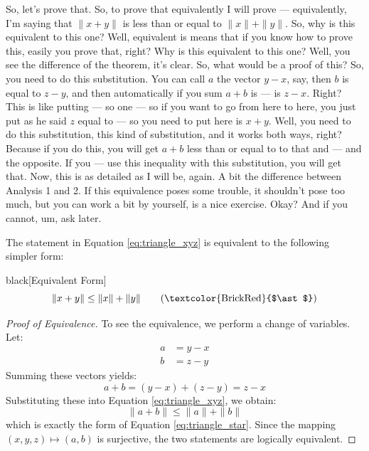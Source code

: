 \begin{spoken-clean}[00:26:37 - 00:29:18]
So, let's prove that. So, to prove that equivalently I will prove --- equivalently, I'm saying that $\|x + y\|$ is less than or equal to $\|x\| + \|y\|$.  So, why is this equivalent to this one? Well, equivalent is means that if you know how to prove this, easily you prove that, right? Why is this equivalent to this one? Well, you see the difference of the theorem, it's clear. So, what would be a proof of this? So, you need to do this substitution. You can call $a$ the vector $y - x$, say, then $b$ is equal to $z - y$, and then automatically if you sum $a + b$ is --- is $z - x$. Right?  This is like putting --- so one --- so if you want to go from here to here, you just put as he said $z$ equal to --- so you need to put here is $x + y$. Well, you need to do this substitution, this kind of substitution, and it works both ways, right? Because if you do this, you will get $a + b$ less than or equal to to that and --- and the opposite. If you --- use this inequality with this substitution, you will get that. Now, this is as detailed as I will be, again. A bit the difference between Analysis 1 and 2. If this equivalence poses some trouble, it shouldn't pose too much, but you can work a bit by yourself, is a nice exercise. Okay? And if you cannot, um, ask later.
\end{spoken-clean}

\begin{math-stroke}
The statement in Equation \ref{eq:triangle_xyz} is equivalent to the following simpler form:
\begin{color-box}{black}[Equivalent Form]
\begin{equation} \label{eq:triangle_star}
\|x + y\| \le \|x\| + \|y\| \tag{\textcolor{BrickRed}{$\ast$}}
\end{equation}
\end{color-box}

\begin{proof}[Proof of Equivalence]
To see the equivalence, we perform a change of variables. Let:
\begin{align*}
a &= y - x \\
b &= z - y
\end{align*}
Summing these vectors yields:
\[ a + b = (y - x) + (z - y) = z - x \]
Substituting these into Equation \ref{eq:triangle_xyz}, we obtain:
\[ \|a + b\| \le \|a\| + \|b\| \]
which is exactly the form of Equation \ref{eq:triangle_star}. Since the mapping $(x, y, z) \mapsto (a, b)$ is surjective, the two statements are logically equivalent.
\end{proof}
\end{math-stroke}


